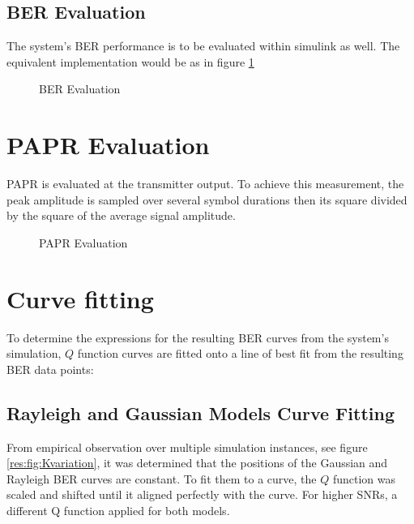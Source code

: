 \subsection{BER Evaluation}
The system's \gls{BER} performance is to be evaluated within \gls{simulink} as well. The equivalent implementation would be as in figure \ref{fig:ber_blk_meth}
\begin{figure}[htpb!]
	\centerline{\resizebox{15cm}{!}{}}
	\caption{\gls{BER} Evaluation}
	\label{fig:ber_blk_meth}
\end{figure}

\section{PAPR Evaluation}
\gls{PAPR} is evaluated at the transmitter output. To achieve this measurement, the peak amplitude is sampled over several symbol durations then its square divided by the square of the average signal amplitude.
\begin{figure}[!h]
	\centerline{\resizebox{10cm}{!}{}}
	\caption{\gls{PAPR} Evaluation}
	\label{fig:papr_blk_meth}
\end{figure}
\pagebreak
\section{Curve fitting}

To determine the expressions for  the resulting BER curves from the system's simulation, \(Q\) function curves are fitted onto a line of best fit from the resulting BER data points:
\subsection{Rayleigh and Gaussian Models Curve Fitting}
From empirical observation over multiple simulation instances, see figure \ref{res:fig:Kvariation}, it was determined that the positions of the Gaussian and Rayleigh \gls{BER} curves are constant. To fit them to a curve, the \(Q\) function was scaled and shifted until it aligned perfectly with the curve. For higher \gls{SNR}s, a different Q function applied for both models.

